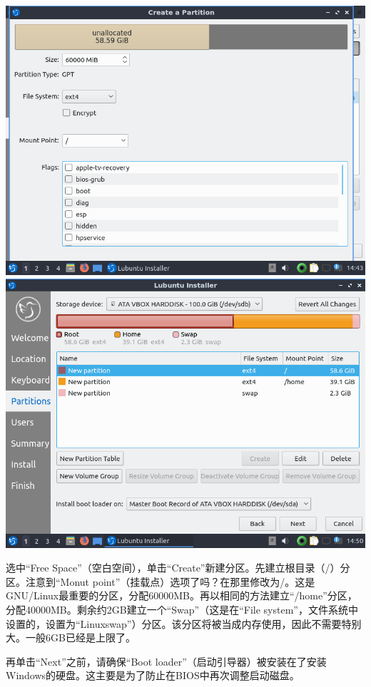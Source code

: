 \begin{center}
	\includegraphics[scale=0.4]{pic/lubinst10}	\includegraphics[scale=0.4]{pic/lubinst11}
\end{center} \par
选中“Free Space”（空白空间），单击“Create”新建分区。先建立根目录（/）分区。注意到“Monut point”（挂载点）选项了吗？在那里修改为/。这是GNU/Linux最重要的分区，分配60000MB。再以相同的方法建立“/home”分区，分配40000MB。剩余约2GB建立一个“Swap”（这是在“File system”，文件系统中设置的，设置为“Linuxswap”）分区。该分区将被当成内存使用，因此不需要特别大。一般6GB已经是上限了。\par
再单击“Next”之前，请确保“Boot loader”（启动引导器）被安装在了安装Windows的硬盘。这主要是为了防止在BIOS中再次调整启动磁盘。
